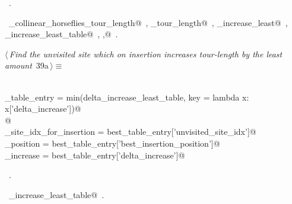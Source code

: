 \documentclass[11.5pt]{report}
\begin{document}
\begin{flushleft}
\begin{list}{}{}
\mbox{}\verb@                                   'best_insertion_position' : ibest, \@\\
\mbox{}\verb@                                   'delta_increase'          : delta_increase_least})@\\
\mbox{}\verb@@{\NWsep}
\end{list}
\vspace{-1.5ex}
\footnotesize
\begin{list}{}{\setlength{\itemsep}{-\parsep}\setlength{\itemindent}{-\leftmargin}}
\item \NWtxtMacroRefIn\ .
\item \NWtxtIdentsUsed\nobreak\  \verb@compute_collinear_horseflies_tour_length@\nobreak\ , \verb@current_tour_length@\nobreak\ , \verb@delta_increase_least@\nobreak\ , \verb@delta_increase_least_table@\nobreak\ , \verb@ibest,@\nobreak\ .
\item{}
\end{list}
\vspace{4ex}
\end{flushleft}
\newchunk 
\begin{flushleft} \small\label{scrap37}\raggedright\small
{} $\langle\,${\itshape Find the unvisited site which on insertion increases tour-length by the least amount}\nobreak\ {\footnotesize {39a}}$\,\rangle\equiv$
\vspace{-1ex}
\begin{list}{}{} \item
\mbox{}\verb@@\\
\mbox{}\verb@best_table_entry = min(delta_increase_least_table, key = lambda x: x['delta_increase'])@\\
\mbox{}\verb@         @\\
\mbox{}\verb@unvisited_site_idx_for_insertion = best_table_entry['unvisited_site_idx']@\\
\mbox{}\verb@insertion_position               = best_table_entry['best_insertion_position']@\\
\mbox{}\verb@delta_increase                   = best_table_entry['delta_increase']@\\
\mbox{}\verb@@{\NWsep}
\end{list}
\vspace{-1.5ex}
\footnotesize
\begin{list}{}{\setlength{\itemsep}{-\parsep}\setlength{\itemindent}{-\leftmargin}}
\item \NWtxtMacroRefIn\ .
\item \NWtxtIdentsUsed\nobreak\  \verb@delta_increase_least_table@\nobreak\ .
\item{}
\end{list}
\vspace{4ex}
\end{flushleft}
\end{document}
